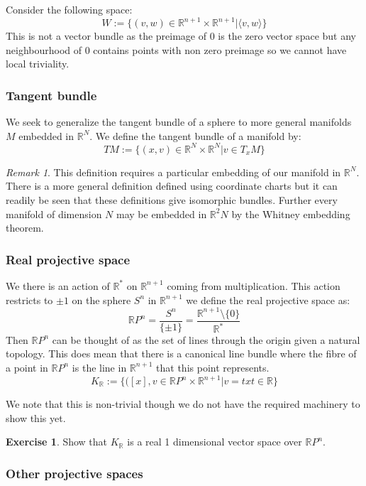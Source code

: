 \documentclass[a4paper,10pt]{article}
\theoremstyle{plain}%
\theoremstyle{definition}
\newtheorem{exer}{Exercise}
\theoremstyle{remark}
\newtheorem{rem}{Remark}
\newcommand{\RR}{\mathbb{R}}
\begin{document}
Consider the following space:
$$W:=\{ (v,w) \in \RR^{n+1}\times \RR^{n+1} | \langle v,w \rangle \}$$
This is not a vector bundle as the preimage of $0$ is the zero vector space but any neighbourhood of $0$ 
contains points with non zero preimage so we cannot have local triviality.

\subsubsection{Tangent bundle}

We seek to generalize the tangent bundle of a sphere to more general manifolds $M$ embedded in $\RR^N$.
We define the tangent bundle of a manifold by:
$$TM:=\{ (x,v)\in \RR^N\times\RR^N | v\in T_xM \}$$

\begin{rem}
 This definition requires a particular embedding of our manifold in $\RR^N$. There is a more general definition
defined using coordinate charts but it can readily be seen that these definitions give isomorphic bundles. Further 
every manifold of dimension $N$ may be embedded in $\RR^2N$ by the Whitney embedding theorem. 
\end{rem}


\subsubsection{Real projective space}

We there is an action of $\RR^\ast$ on $\RR^{n+1}$ coming from multiplication. This action restricts to $\pm 1$ on 
the sphere $S^n$ in $\RR^{n+1}$ we define the real projective space as:
$$\RR P^n = \frac{S^n}{\{\pm 1\}} = \frac{\RR^{n+1}\setminus\{0\}}{\RR^\ast}$$
Then $\RR P^n$ can be thought of as the set of lines through the origin given a natural topology. This does mean 
that there is a canonical line bundle where the fibre of a point in $\RR P^n$ is the line in $\RR^{n+1}$ that this 
point represents.
$$K_\RR := \{ ([x],v\in \RR P^n\times \RR^{n+1} | v=tx t\in \RR\}$$

We note that this is non-trivial though we do not have the required machinery to show this yet.

\begin{exer}
 Show that $K_\RR$ is a real 1 dimensional vector space over $\RR P^n$.
\end{exer}


\subsubsection{Other projective spaces}
\end{document}
